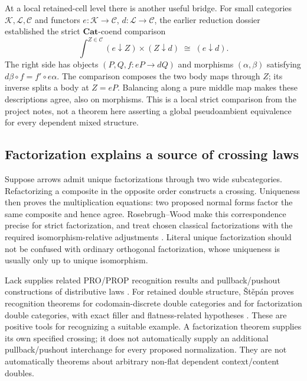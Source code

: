 \documentclass[11pt,letterpaper]{article}
\newcommand{\Cat}{\mathbf{Cat}}
\newcommand{\comp}{\mathbin{\circ}}
\begin{document}
At a local retained-cell level there is another useful bridge. For small categories $\mathcal K,\mathcal L,\mathcal C$ and functors $e:\mathcal K\to\mathcal C$, $d:\mathcal L\to\mathcal C$, the earlier reduction dossier established the strict $\Cat$-coend comparison
\begin{equation}\label{eq:coend}
\int^{Z\in\mathcal C}(e\downarrow Z)\times(Z\downarrow d)
 \;\cong\;(e\downarrow d).
\end{equation}
The right side has objects $(P,Q,f:eP\to dQ)$ and morphisms $(\alpha,\beta)$ satisfying $d\beta\comp f=f'\comp e\alpha$. The comparison composes the two body maps through $Z$; its inverse splits a body at $Z=eP$. Balancing along a pure middle map makes these descriptions agree, also on morphisms. This is a local strict comparison from the project notes, not a theorem here asserting a global pseudoambient equivalence for every dependent mixed structure.

\subsection{Factorization explains a source of crossing laws}
Suppose arrows admit unique factorizations through two wide subcategories. Refactorizing a composite in the opposite order constructs a crossing. Uniqueness then proves the multiplication equations: two proposed normal forms factor the same composite and hence agree. Rosebrugh--Wood make this correspondence precise for strict factorization, and treat chosen classical factorizations with the required isomorphism-relative adjustments \cite[Section 3, Theorem 3.8, Sections 5.7--5.9]{RW}. Literal unique factorization should not be confused with ordinary orthogonal factorization, whose uniqueness is usually only up to unique isomorphism.

Lack supplies related PRO/PROP recognition results and pullback/pushout constructions of distributive laws \cite[Theorems 3.8 and 4.6, Sections 5.3--5.4]{Lack}. For retained double structure, \v{S}t\v{e}p\'an proves recognition theorems for codomain-discrete double categories and for factorization double categories, with exact filler and flatness-related hypotheses \cite[Theorems 3.3.7 and 3.3.33]{Stepan}. These are positive tools for recognizing a suitable example. A factorization theorem supplies its own specified crossing; it does not automatically supply an additional pullback/pushout interchange for every proposed normalization. They are not automatically theorems about arbitrary non-flat dependent context/content doubles.
\end{document}
